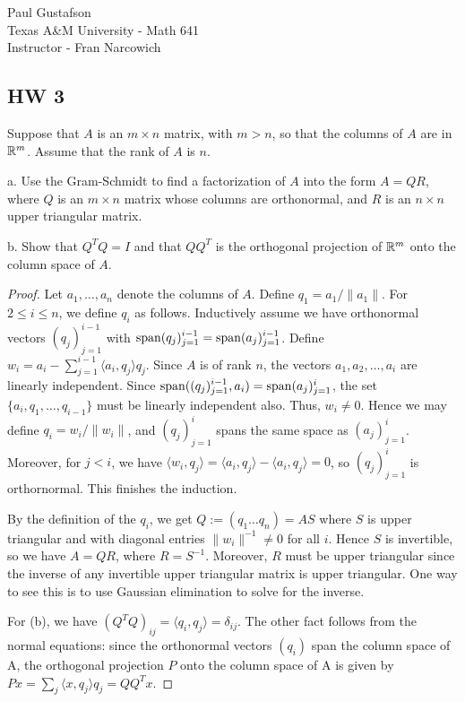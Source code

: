 \documentclass{article}
\begin{document}
\noindent Paul Gustafson\\
\noindent Texas A\&M University - Math 641\\ 
\noindent Instructor - Fran Narcowich

\subsection*{HW 3}
 Suppose that $A$ is an $m \times n$ matrix, with $m > n$, so that the columns of $A$ are in $\mathbb{R}^m$. Assume that the rank of $A$ is $n$.

a. Use the Gram-Schmidt to find a factorization of $A$ into the form $A = QR$, where $Q$ is an $m \times n$ matrix whose columns are orthonormal, and $R$ is an $n \times n$ upper triangular matrix.

b. Show that $Q^TQ = I$ and that $QQ^T$ is the orthogonal projection of $\mathbb{R}^m$ onto the column space of $A$.

\begin{proof}
Let $a_1, \ldots, a_n$ denote the columns of $A$.  Define $q_1 = a_1 / \|a_1\|$. For $2 \le i \le n$, we define $q_i$ as follows.  Inductively assume we have orthonormal vectors $(q_j)_{j=1}^{i-1}$ with $\operatorname{span} (q_j)_{j=1}^{i-1} = \operatorname{span} (a_j)_{j=1}^{i-1}$.  Define $w_i = a_i - \sum_{j=1}^{i-1} \langle a_i, q_j \rangle q_j$.  Since $A$ is of rank $n$, the vectors $a_1, a_2, \ldots, a_i$ are linearly independent. Since $\operatorname{span} ((q_j)_{j=1}^{i-1}, a_i) = \operatorname{span} (a_j)_{j=1}^{i}$, the set $\{a_i, q_1, \ldots, q_{i-1} \}$ must be linearly independent also.  Thus, $w_i \neq 0$.  Hence we may define $q_i = w_i / \|w_i\|$, and $(q_j)_{j=1}^i$  spans the same space as $(a_j)_{j=1}^i$.  Moreover, for $j < i$, we have $\langle w_i, q_j \rangle = \langle a_i, q_j \rangle - \langle a_i, q_j\rangle = 0$, so $(q_j)_{j=1}^i$ is orthornormal. This finishes the induction.

By the definition of the $q_i$, we get $Q := (q_1 \ldots q_n) = A S$ where $S$ is upper triangular and with diagonal entries $\|w_i\|^{-1} \neq 0$ for all $i$. Hence $S$ is invertible, so we have $A = Q R$, where $R = S^{-1}$.  Moreover, $R$ must be upper triangular since the inverse of any invertible upper triangular matrix is upper triangular. One way to see this is to use Gaussian elimination to solve for the inverse.  %

For (b), we have $(Q^T Q)_{ij} = \langle q_i, q_j \rangle = \delta_{ij}$.  The other fact follows from the normal equations: since the orthonormal vectors $(q_i)$ span the column space of A, the orthogonal projection $P$ onto the column space of A is given by $Px = \sum_j \langle x, q_j \rangle q_j = QQ^T x$.
\end{proof}
\end{document}
